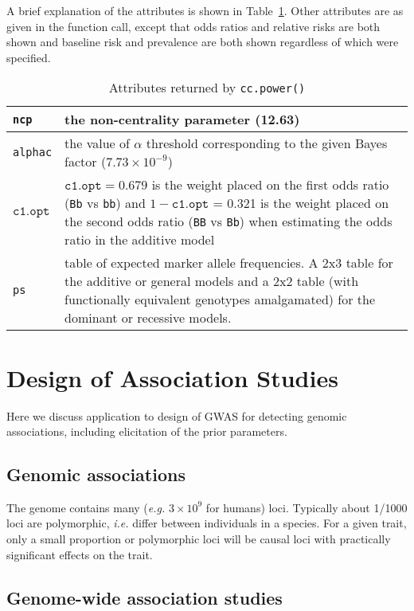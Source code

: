 \documentclass[a4paper,10pt]{amsart}
\def\bb{\texttt{bb}}
\def\Bb{\texttt{Bb}}
\def\BB{\texttt{BB}}
\def\ie{\textit{i.e.}}
\def\eg{\textit{e.g.}}
\begin{document}
\begin{itemize}
A brief explanation of the attributes is shown in Table~\ref{tbl:ccpowerattr}. 
Other attributes are as given in the function call, except that odds ratios and
relative risks are both shown and baseline risk and prevalence are both shown regardless
of which were specified.
\end{itemize}

\begin{table}[htbp]
\caption{Attributes returned by \texttt{cc.power()}}
\label{tbl:ccpowerattr}
\begin{tabular}{|l|p{6cm}|}
\hline\hline
\texttt{ncp} &  the non-centrality parameter (12.63) \\
\hline
\texttt{alphac} &  the value of $\alpha$ threshold corresponding to the
given Bayes factor ($7.73\times 10^{-9}$) \\
\hline
$\texttt{c1.opt}$ & $\texttt{c1.opt} = 0.679$  is the weight placed on the first odds ratio
(\Bb{} vs \bb)
and $1 - \texttt{c1.opt}$ = 0.321 is the weight placed on the second odds ratio
(\BB{} vs \Bb) when estimating the odds ratio in the additive model\\
\hline
\texttt{ps} &  table of expected marker allele frequencies. A 2x3 table
for the additive or general models and a 2x2 table (with functionally equivalent
genotypes amalgamated) for the dominant or recessive models. \\
\hline
\end{tabular}
\end{table}

\section{Design of Association Studies}

Here we discuss application to design of GWAS for detecting genomic
associations, including elicitation of the prior parameters.

\subsection{Genomic associations}

The genome contains many (\eg{} $3\times 10^9$ for humans) loci.
Typically about 1/1000 loci are polymorphic, \ie{} differ between individuals
in a species. For a given trait, only a small proportion or polymorphic loci 
will be causal loci with practically significant effects on the trait.

\subsection{Genome-wide association studies}
\end{document}
